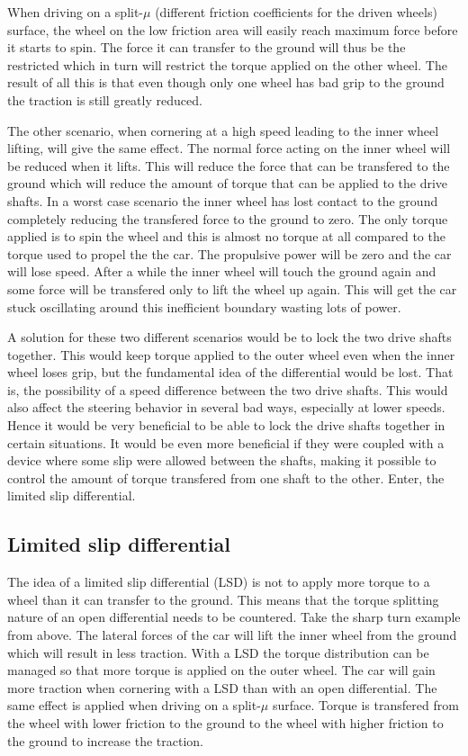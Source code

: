 When driving on a split-$ \mu $ (different friction coefficients for the driven wheels) surface, the wheel on the low friction area will easily reach maximum force before it starts to spin. The force it can transfer to the ground will thus be the restricted which in turn will restrict the torque applied on the other wheel. The result of all this is that even though only one wheel has bad grip to the ground the traction is still greatly reduced.

The other scenario, when cornering at a high speed leading to the inner wheel lifting, will give the same effect. The normal force acting on the inner wheel will be reduced when it lifts. This will reduce the force that can be transfered to the ground which will reduce the amount of torque that can be applied to the drive shafts. In a worst case scenario the inner wheel has lost contact to the ground completely reducing the transfered force to the ground to zero. The only torque applied is to spin the wheel and this is almost no torque at all compared to the torque used to propel the the car. The propulsive power will be zero and the car will lose speed. After a while the inner wheel will touch the ground again and some force will be transfered only to lift the wheel up again. This will get the car stuck oscillating around this inefficient boundary wasting lots of power.

A solution for these two different scenarios would be to lock the two drive shafts together. This would keep torque applied to the outer wheel even when the inner wheel loses grip, but the fundamental idea of the differential would be lost. That is, the possibility of a speed difference between the two drive shafts. This would also affect the steering behavior in several bad ways, especially at lower speeds. Hence it would be very beneficial to be able to lock the drive shafts together in certain situations. It would be even more beneficial if they were coupled with a device where some slip were allowed between the shafts, making it possible to control the amount of torque transfered from one shaft to the other. Enter, the limited slip differential.

\subsection{Limited slip differential}
The idea of a limited slip differential (LSD) is not to apply more torque to a wheel than it can transfer to the ground. This means that the torque splitting nature of an open differential needs to be countered. Take the sharp turn example from above. The lateral forces of the car will lift the inner wheel from the ground which will result in less traction. With a LSD the torque distribution can be managed so that more torque is applied on the outer wheel. The car will gain more traction when cornering with a LSD than with an open differential. The same effect is applied when driving on a split-$ \mu $ surface. Torque is transfered from the wheel with lower friction to the ground to the wheel with higher friction to the ground to increase the traction.

